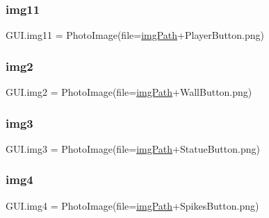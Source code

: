 \mbox{\label{namespace_g_u_i_a54eba3e54367f4dc592947bf19468e7f}} 
\subsubsection{\texorpdfstring{img11}{img11}}
{\footnotesize\ttfamily G\+U\+I.\+img11 = Photo\+Image(file=\mbox{\hyperlink{namespace_g_u_i_a293e22c0a27a45862ad50fcb8ed12f15}{img\+Path}}+\textquotesingle{}Player\+Button.\+png\textquotesingle{})}

\mbox{\label{namespace_g_u_i_a49cad6894844031f41a996947032a4a4}} 
\subsubsection{\texorpdfstring{img2}{img2}}
{\footnotesize\ttfamily G\+U\+I.\+img2 = Photo\+Image(file=\mbox{\hyperlink{namespace_g_u_i_a293e22c0a27a45862ad50fcb8ed12f15}{img\+Path}}+\textquotesingle{}Wall\+Button.\+png\textquotesingle{})}

\mbox{\label{namespace_g_u_i_a06adcfe75921645a1ef64cf7a4cdb3fd}} 
\subsubsection{\texorpdfstring{img3}{img3}}
{\footnotesize\ttfamily G\+U\+I.\+img3 = Photo\+Image(file=\mbox{\hyperlink{namespace_g_u_i_a293e22c0a27a45862ad50fcb8ed12f15}{img\+Path}}+\textquotesingle{}Statue\+Button.\+png\textquotesingle{})}

\mbox{\label{namespace_g_u_i_a63bec101ed0dcb5864839c78fcb02572}} 
\subsubsection{\texorpdfstring{img4}{img4}}
{\footnotesize\ttfamily G\+U\+I.\+img4 = Photo\+Image(file=\mbox{\hyperlink{namespace_g_u_i_a293e22c0a27a45862ad50fcb8ed12f15}{img\+Path}}+\textquotesingle{}Spikes\+Button.\+png\textquotesingle{})}

\mbox{\label{namespace_g_u_i_a3e9631bef05195054e18899712ee62e7}} 
